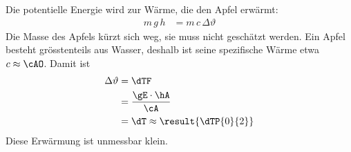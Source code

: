 Die potentielle Energie wird zur Wärme, die den Apfel erwärmt:
\begin{align}
 m\,g\,h &= m\,c\,\Delta\vartheta
\end{align}
Die Masse des Apfels kürzt sich weg, sie muss nicht geschätzt werden. Ein Apfel besteht grösstenteils aus Wasser, deshalb ist seine spezifische Wärme etwa $c \approx \cAO$. Damit ist
\begin{align}
 \Delta\vartheta &= \dTF \\
   &= \frac{\gE\cdot\hA}{\cA} \\
   &= \dT \approx \result{\dTP{0}{2}}
\end{align}
Diese Erwärmung ist unmessbar klein.
